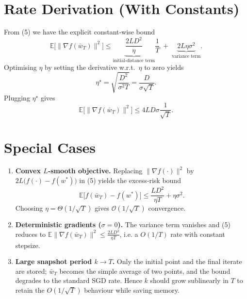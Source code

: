 \documentclass{article}
\newcommand{\E}{\mathbb{E}}
\begin{document}
\section*{Rate Derivation (With Constants)}
From (5) we have the explicit constant‑wise bound
\[
\E\big[\|\nabla f(\bar w_T)\|^2\big]\le
\underbrace{\frac{2L D^2}{\eta}}_{\text{initial‑distance term}}\frac{1}{T}
\;+\;
\underbrace{2L\eta\sigma^2}_{\text{variance term}} .
\]
Optimising $\eta$ by setting the derivative w.r.t.\ $\eta$ to zero yields
\[
\eta^\star = \sqrt{\frac{D^2}{\sigma^2 T}} = \frac{D}{\sigma\sqrt{T}} .
\]
Plugging $\eta^\star$ gives
\[
\E\big[\|\nabla f(\bar w_T)\|^2\big]\le
4L D\sigma\frac{1}{\sqrt{T}} .
\]

\section*{Special Cases}
\begin{enumerate}
\item \textbf{Convex $L$‑smooth objective.} Replacing $\|\nabla f(\cdot)\|^2$ by $2L\big(f(\cdot)-f(w^*)\big)$ in (5) yields the excess‑risk bound
\[
\E\big[f(\bar w_T)-f(w^*)\big]\le
\frac{L D^2}{\eta T}+ \eta\sigma^2 .
\]
Choosing $\eta=\Theta(1/\sqrt{T})$ gives $\mathcal{O}(1/\sqrt{T})$ convergence.
\item \textbf{Deterministic gradients ($\sigma=0$).} The variance term vanishes and (5) reduces to $\E\|\nabla f(\bar w_T)\|^2\le \frac{2L D^2}{\eta T}$, i.e. a $O(1/T)$ rate with constant stepsize.
\item \textbf{Large snapshot period $k\to T$.} Only the initial point and the final iterate are stored; $\bar w_T$ becomes the simple average of two points, and the bound degrades to the standard SGD rate. Hence $k$ should grow sublinearly in $T$ to retain the $O(1/\sqrt{T})$ behaviour while saving memory.
\end{enumerate}
\end{document}
